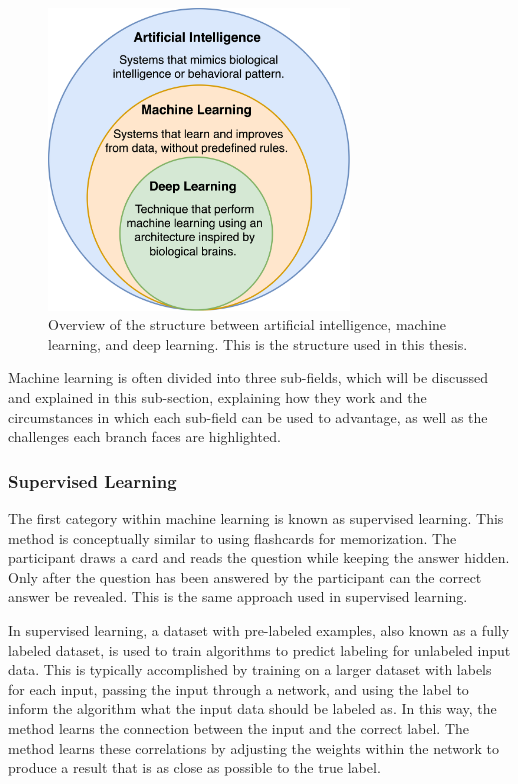     \begin{figure}[htb]
        \centering
        \includegraphics[width=8cm]{images/ai_ml_dnn.png}
        \caption{Overview of the structure between artificial intelligence, machine learning, and deep learning. This is the structure used in this thesis.}
        \label{fig:ai_ml_dnn}
    \end{figure} 

    Machine learning is often divided into three sub-fields, which will be discussed and explained in this sub-section, explaining how they work and the circumstances in which each sub-field can be used to advantage, as well as the challenges each branch faces are highlighted.

        \subsubsection{Supervised Learning}

        The first category within machine learning is known as supervised learning. This method is conceptually similar to using flashcards for memorization.
        The participant draws a card and reads the question while keeping the answer hidden. Only after the question has been answered by the participant can the correct answer be revealed. This is the same approach used in supervised learning.
        
        
        In supervised learning, a dataset with pre-labeled examples, also known as a fully labeled dataset, is used to train algorithms to predict labeling for unlabeled input data. This is typically accomplished by training on a larger dataset with labels for each input, passing the input through a network, and using the label to inform the algorithm what the input data should be labeled as. In this way, the method learns the connection between the input and the correct label. The method learns these correlations by adjusting the weights within the network to produce a result that is as close as possible to the true label.
        
